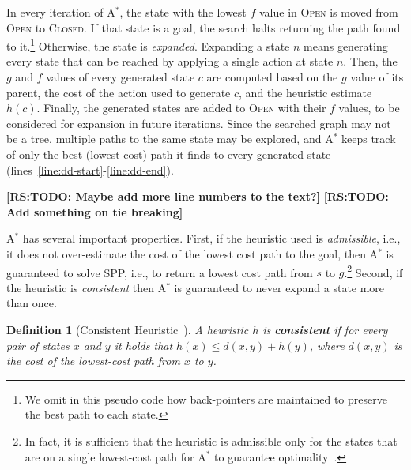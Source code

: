 \documentclass{aicom2e}
\newtheorem{definition}{Definition}
\newcommand{\astar}{A$^*$}
\newcommand{\open}{\textsc{Open}}
\newcommand{\closed}{\textsc{Closed}}
\newcommand{\roni}[1]{\textbf{[RS:#1]}}
\begin{document}
In every iteration of \astar{}, the state with the lowest $f$ value in \open{} is moved from \open{} to \closed{}. 
If that state is a goal, the search halts returning the path found to it.\footnote{We omit in this pseudo code how back-pointers are maintained to  preserve the best path to each state.} Otherwise, the state is {\em expanded}.  
Expanding a state $n$ means generating every state that can be reached by applying a single action at state $n$. 
Then, the $g$ and $f$ values of every generated state $c$ are computed based on the $g$ value of its parent, the cost of the action used to generate $c$, and the heuristic estimate $h(c)$. Finally, the generated states are added to \open{} with their $f$ values, to be considered for expansion in future iterations. Since the searched graph may not be a tree, multiple paths to the same state may be explored, and \astar{} keeps track of only the best (lowest cost) path it finds to every generated state (lines~\ref{line:dd-start}-\ref{line:dd-end}).  


\roni{TODO: Maybe add more line numbers to the text?}
\roni{TODO: Add something on tie breaking}

\astar{} has several important properties. First, if the heuristic used is {\em admissible}, i.e., it does not over-estimate the cost of the lowest cost path to the goal, then \astar{} is guaranteed to solve SPP, i.e., to return a lowest cost path from $s$ to $g$.\footnote{In fact, it is sufficient that the heuristic is admissible only for the states that are on a single lowest-cost path for \astar{} to guarantee optimality~\cite{karpas2012optimal,dechter1985generalizedBestFirst}.} 
Second, if the heuristic is {\em consistent} then \astar{} is guaranteed to never expand a state more than once. 
\begin{definition}[Consistent Heuristic~\cite{hartNR68Astar}]
    A heuristic $h$ is {\bf consistent} if for every pair of states $x$ and $y$
    it holds that $h(x)\leq d(x,y)+h(y)$, where $d(x, y)$ is
    the cost of the lowest-cost path from $x$ to $y$.
    \label{def:consistent}
\end{definition}
\end{document}
